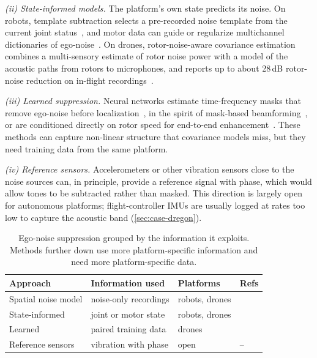 \emph{(ii) State-informed models.}
The platform's own state predicts its noise.
On robots, template subtraction selects a pre-recorded noise template from the current joint status~\cite{ince2009template}, and motor data can guide or regularize multichannel dictionaries of ego-noise~\cite{schmidt2016dictionary,schmidt2018egonoise,schmidt2019informed}.
On drones, rotor-noise-aware covariance estimation combines a multi-sensory estimate of rotor noise power with a model of the acoustic paths from rotors to microphones, and reports up to about 28\,dB rotor-noise reduction on in-flight recordings~\cite{yen2023ncm}.

\emph{(iii) Learned suppression.}
Neural networks estimate time-frequency masks that remove ego-noise before localization~\cite{wang2022drone}, in the spirit of mask-based beamforming~\cite{heymann2016mask}, or are conditioned directly on rotor speed for end-to-end enhancement~\cite{gulli2025rotor}.
These methods can capture non-linear structure that covariance models miss, but they need training data from the same platform.

\emph{(iv) Reference sensors.}
Accelerometers or other vibration sensors close to the noise sources can, in principle, provide a reference signal with phase, which would allow tones to be subtracted rather than masked.
This direction is largely open for autonomous platforms; flight-controller IMUs are usually logged at rates too low to capture the acoustic band (\cref{sec:case-dregon}).

\begin{table}[t]
\centering
\footnotesize
\setlength{\tabcolsep}{3pt}
\begin{tabular}{@{}L{1.75cm}L{2.15cm}L{1.65cm}L{1.9cm}@{}}
\toprule
Approach & Information used & Platforms & Refs \\
\midrule
Spatial noise model & noise-only recordings & robots, drones & \cite{nakamura2011gevd,okutani2012quadrocopter,furukawa2013ncm} \\
State-informed & joint or motor state & robots, drones & \cite{ince2009template,schmidt2016dictionary,schmidt2018egonoise,schmidt2019informed,yen2023ncm} \\
Learned & paired training data & drones & \cite{wang2022drone,gulli2025rotor} \\
Reference sensors & vibration with phase & open & -- \\
\bottomrule
\end{tabular}
\caption{Ego-noise suppression grouped by the information it exploits. Methods further down use more platform-specific information and need more platform-specific data.}
\label{tab:egonoise}
\end{table}

